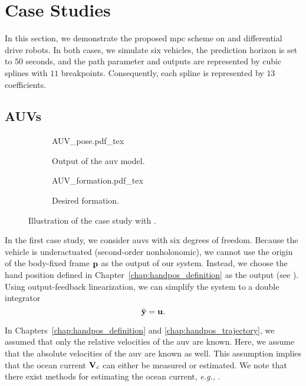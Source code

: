 \section{Case Studies}
\label{sec:MPC_case_studies}


In this section, we demonstrate the proposed \gls{mpc} scheme on  and differential drive robots.
In both cases, we simulate six vehicles, the prediction horizon is set to $50$ seconds, and the path parameter and outputs are represented by cubic splines with $11$ breakpoints.
Consequently, each spline is represented by $13$ coefficients.

\subsection{AUVs}

\begin{figure}[b]
    \centering
    \begin{subfigure}[t]{0.35\textwidth}
        \centering
        \def\svgwidth{\textwidth}
        {AUV_pose.pdf_tex}
        \caption{Output of the \gls{auv} model.}
        \label{fig:MPC_AUV_pose}        
    \end{subfigure}
    \hspace*{0.15\textwidth}
    \begin{subfigure}[t]{0.35\textwidth}
        \centering
        \def\svgwidth{\textwidth}
        {AUV_formation.pdf_tex}
        \caption{Desired formation.}
        \label{fig:MPC_AUV_formation}
    \end{subfigure}
    \caption{Illustration of the case study with .}
\end{figure}

In the first case study, we consider \glspl{auv} with six degrees of freedom.
Because the vehicle is underactuated (second-order nonholonomic), we cannot use the origin of the body-fixed frame $\mathbf{p}$ as the output of our system.
Instead, we choose the hand position defined in Chapter~\ref{chap:handpos_definition} as the output (see ).
Using output-feedback linearization, we can simplify the system to a double integrator 
\begin{equation}
    \ddot{\mathbf{y}} = \mathbf{u}. 
\end{equation}

\begin{rmk*}
    In Chapters~\ref{chap:handpos_definition} and \ref{chap:handpos_trajectory}, we assumed that only the relative velocities of the \gls{auv} are known.
    Here, we assume that the absolute velocities of the \gls{auv} are known as well.
    This assumption implies that the ocean current $\mathbf{V}_c$ can either be measured or estimated.
    We note that there exist methods for estimating the ocean current, \emph{e.g.,} \cite{zhu_kalman_2016}.
\end{rmk*}

